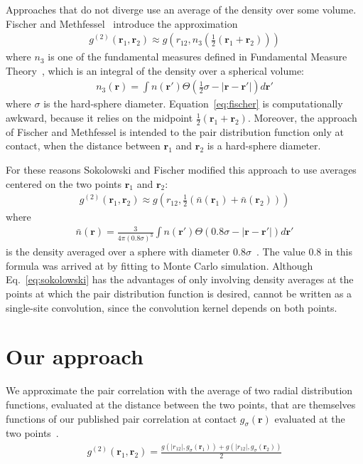 \documentclass[letterpaper,twocolumn,amsmath,amssymb,pre,aps,10pt]{revtex4-1}
\newcommand{\rr}{\textbf{r}}
\begin{document}
Approaches that do not diverge use an average of the density over some
volume. Fischer and Methfessel~\cite{fischer1980born} introduce the
approximation
\begin{align}
  g^{(2)}(\rr_1,\rr_2) \approx g\left(r_{12}, n_3\left(\tfrac12
  (\rr_1+\rr_2)\right)\right)
  \label{eq:fischer}
\end{align}
where $n_3$ is one of the fundamental measures defined in Fundamental
Measure Theory~\cite{rosenfeld1989free}, which is an integral of the
density over a spherical volume:
\begin{align}
  n_3(\rr) = \int n(\rr')\Theta(\tfrac12 \sigma - |\rr-\rr'|) d\rr'
\end{align}
where $\sigma$ is the hard-sphere diameter.  Equation~\ref{eq:fischer}
is computationally awkward, because it relies on the midpoint
$\tfrac12(\rr_1+\rr_2)$.  Moreover, the approach of Fischer and
Methfessel is intended to the pair distribution function only at contact,
when the distance between $\rr_1$ and $\rr_2$ is a hard-sphere
diameter.

For these reasons Sokolowski and Fischer modified this approach to use
averages centered on the two points $\rr_1$ and $\rr_2$:
\begin{align}
  g^{(2)}(\rr_1,\rr_2) \approx g\left(r_{12},
  \tfrac12(\bar{n}(\rr_1)+\bar{n}(\rr_2))\right)
  \label{eq:sokolowski}
\end{align}
where
\begin{align}
  \bar{n}(\rr) = \frac{3}{4\pi (0.8\sigma)^3}\int n(\rr')\Theta(0.8\sigma - |\rr-\rr'|) d\rr'
\end{align}
is the density averaged over a sphere with diameter
$0.8\sigma$~\cite{sokolowski1992role}.  The value 0.8 in this formula
was arrived at by fitting to Monte Carlo simulation.  Although
Eq.~\ref{eq:sokolowski} has the advantages of only involving density
averages at the points at which the pair distribution function is
desired, cannot be written as a single-site convolution, since the
convolution kernel depends on both points.



\section{Our approach}
We approximate the pair correlation with the average of two radial
distribution functions, evaluated at the distance between the two
points, that are themselves functions of our published pair
correlation at contact $g_{\sigma}(\rr)$ evaluated at the two
points~\cite{schulte2012using}.
\begin{align}
  g^{(2)}(\rr_1,\rr_2) = \frac{g(|r_{12}|, g_\sigma(\rr_1)) + g(|r_{12}|, g_\sigma(\rr_2))}{2}
\end{align}
\end{document}
